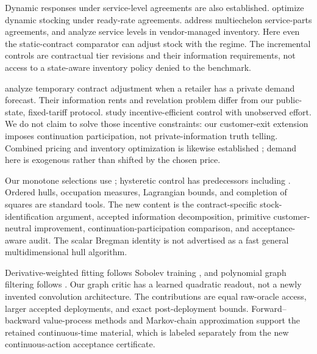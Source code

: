 \documentclass[11pt,letterpaper]{article}
\theoremstyle{definition}
\newcommand{\1}{\mathbf 1}
\begin{document}
Dynamic responses under service-level agreements are also established. \citet{Hosseinifard2022} optimize dynamic stocking under ready-rate agreements. \citet{Caggiano2007} address multiechelon service-parts agreements, and \citet{Abbasi2022} analyze service levels in vendor-managed inventory. Here even the static-contract comparator can adjust stock with the regime. The incremental controls are contractual tier revisions and their information requirements, not access to a state-aware inventory policy denied to the benchmark.

\citet{NasserTurcic2019} analyze temporary contract adjustment when a retailer has a private demand forecast. Their information rents and revelation problem differ from our public-state, fixed-tariff protocol. \citet{PlambeckZenios2003} study incentive-efficient control with unobserved effort. We do not claim to solve those incentive constraints: our customer-exit extension imposes continuation participation, not private-information truth telling. Combined pricing and inventory optimization is likewise established \citep{FedergruenHeching1999}; demand here is exogenous rather than shifted by the chosen price.

Our monotone selections use \citet{Topkis1978}; hysteretic control has predecessors including \citet{HippHolzbaur1988}. Ordered hulls, occupation measures, Lagrangian bounds, and completion of squares are standard tools. The new content is the contract-specific stock-identification argument, accepted information decomposition, primitive customer-neutral improvement, continuation-participation comparison, and acceptance-aware audit. The scalar Bregman identity is not advertised as a fast general multidimensional hull algorithm.

Derivative-weighted fitting follows Sobolev training \citep{Czarnecki2017}, and polynomial graph filtering follows \citet{Defferrard2016}. Our graph critic has a learned quadratic readout, not a newly invented convolution architecture. The contributions are equal raw-oracle access, larger accepted deployments, and exact post-deployment bounds. Forward--backward value-process methods \citep{MaProtterYong1994,HanJentzenE2018} and Markov-chain approximation \citep{KushnerDupuis2001} support the retained continuous-time material, which is labeled separately from the new continuous-action acceptance certificate.









\appendix

\clearpage
\end{document}
